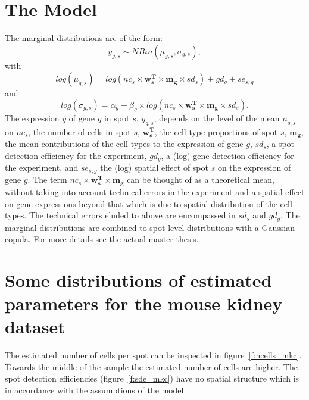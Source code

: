 \documentclass{article}\usepackage[]{graphicx}\usepackage[]{xcolor}
\begin{document}
\section{The Model} \label{sec:Model}

The marginal distributions are of the form: $$y_{g,s}\sim NBin(\mu_{g,s}, \sigma_{g,s}),$$ with $$log(\mu_{g,s})=log(nc_{s} \times \boldsymbol{w_{s}^T} \times \boldsymbol{m_{g}} \times sd_{s}) + gd_{g} + se_{s,g}$$ and $$log(\sigma_{g,s})=\alpha_{g}+\beta_{g}\times log(nc_{s} \times \boldsymbol{w_{s}^T} \times \boldsymbol{m_{g}} \times sd_{s}).$$ The expression $y$ of gene $g$ in spot $s$, $y_{g,s}$, depends on the level of the mean $\mu_{g,s}$ on $nc_{s}$, the number of cells in spot $s$, $\boldsymbol{w_{s}^T}$, the cell type proportions of spot $s$, $\boldsymbol{m_{g}}$, the mean contributions of the cell types to the expression of gene $g$, $sd_{s}$, a spot detection efficiency for the experiment, $gd_{g}$, a (log) gene detection efficiency for the experiment, and $se_{s,g}$ the (log) spatial effect of spot $s$ on the expression of gene $g$. The term $nc_{s} \times \boldsymbol{w_{s}^T} \times \boldsymbol{m_{g}}$ can be thought of as a theoretical mean, without taking into account technical errors in the experiment and a spatial effect on gene expressions beyond that which is due to spatial distribution of the cell types. The technical errors eluded to above are encompassed in $sd_{s}$ and $gd_{g}$. The marginal distributions are combined to spot level distributions with a Gaussian copula. For more details see the actual master thesis.


\section{Some distributions of estimated parameters for the mouse kidney dataset} \label{sec:distributions_estimation}



The estimated number of cells per spot can be inspected in figure~\ref{f:ncells_mkc}. Towards the middle of the sample the estimated
number of cells are higher. The spot detection efficiencies (figure~\ref{f:sde_mkc}) have no spatial structure which is in accordance with the assumptions of the model.
\end{document}
